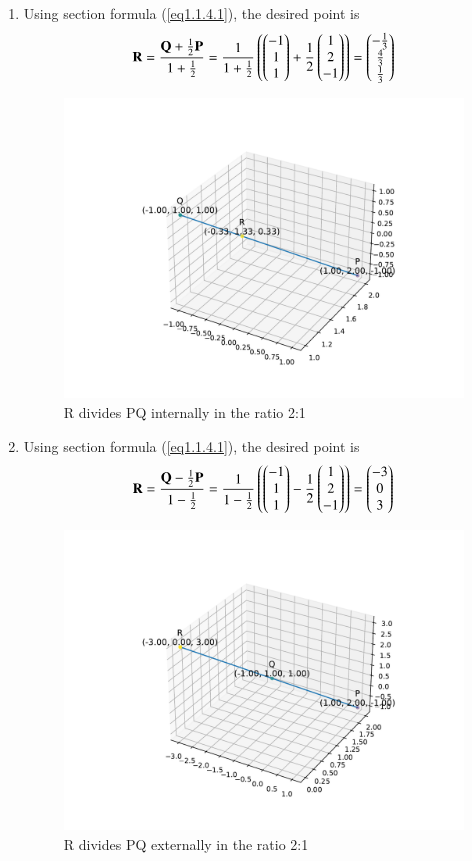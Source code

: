 \documentclass[journal]{IEEEtran}
\begin{document}
\begin{enumerate}
	\item Using section formula (\ref{eq1.1.4.1}), the desired point is 
		\begin{align}
			\mathbf{R} = \frac{\mathbf{Q} + \frac{1}{2}\mathbf{P}}{1 + \frac{1}{2}} = \frac{1}{1 + \frac{1}{2}}\left(\begin{pmatrix}-1 \\ 1 \\ 1\end{pmatrix} + \frac{1}{2}\begin{pmatrix}1 \\ 2 \\ -1\end{pmatrix}\right) = \begin{pmatrix}-\frac{1}{3} \\ \frac{4}{3} \\ \frac{1}{3}\end{pmatrix}	
		\end{align}
		\begin{figure}[h!]
			\centering
			\includegraphics[width=0.7\linewidth]{figs/fig1.pdf}
			\caption{R divides PQ internally in the ratio 2:1}
		\end{figure}
	\item Using section formula (\ref{eq1.1.4.1}), the desired point is 
		\begin{align}
			\mathbf{R} = \frac{\mathbf{Q} - \frac{1}{2}\mathbf{P}}{1 - \frac{1}{2}} = \frac {1}{1 - \frac{1}{2}} \left(\begin{pmatrix}-1 \\ 1 \\ 1\end{pmatrix} - \frac{1}{2}\begin{pmatrix}1 \\ 2 \\ -1\end{pmatrix}\right) = \begin{pmatrix}-3 \\ 0 \\ 3\end{pmatrix}
		\end{align}
		\begin{figure}[h!]
			\centering
			\includegraphics[width=0.7\linewidth]{figs/fig2.pdf}
			\caption{R divides PQ externally in the ratio 2:1}
		\end{figure}
\end{enumerate}
\end{document}
